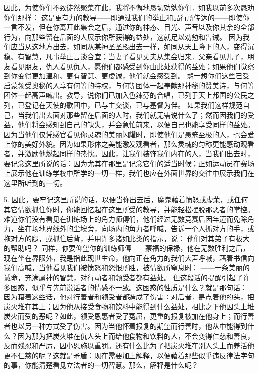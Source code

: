 因此，为使你们不致徒然聚集在此，我将不懈地恳切劝勉你们，如我以前多次恳劝你们那样： 这是更有力的教导——即通过我们的举止和品行所传达的——即使你一言不发，但在你离开此集会之后，通过你的神态、目光、声音以及你其余的全部行为，向那些留在后面的人展示你所获得的益处，这就足以劝勉和告诫。\newline{} 因为我们应当从这地方出去，如同从某神圣圣殿出去一样，如同从天上降下的人，变得沉稳、有智慧，凡事举止言谈合宜；当妻子看见丈夫从集会归来，父亲看见儿子，朋友看见朋友，仇人看见仇人，愿他们都感受到你由此处获得的益处；如果他们觉察到你变得更加温和、更有智慧、更虔诚，他们就会感受到。\newline{} 想一想你们这些已受启蒙领受奥秘的人享有何等的特权，与何等团体一起奉献那神秘的赞美诗，与何等团体一起高声喊出。教导，说你们已加入色辣芬的合唱，已列于天上邦国的公民之列，已登记在天使的歌团中，已与主交谈，已与基督为伴。\newline{} 如果我们这样规范自己，当我们出去面对那些留在后面的人时，我们就无需说什么了；然而因我们的受益，他们将会感知到自己的缺失，并会急忙前来，以便自己也能享受同样的益处。因为当他们仅凭感官看见你灵魂的美丽闪耀时，即使他们是愚笨至极的人，也会爱上你的美好外貌。因为如果形体之美能激发观看者，那么灵魂的匀称更能感动观看者，并激励他燃起同样的热忱。因此，让我们装饰我们内在的人，当我们出去时，要记念这里所说的话：因为尤其在那里是记念它们的适当时候；正如运动员在赛场上展示他在训练学校中所学的一切一样，我们也应在外面世界的交往中展示我们在这里所听到的一切。\par

5. 因此，要牢记这里所说的话，以便当你出去后，魔鬼藉着愤怒或虚荣，或任何其它情欲抓住你时，你能回忆起在这里所受的教导，并能轻松摆脱那恶者的掌控。\newline{} 难道你们没有看见在训练场上的角力师傅们，他们经过无数竞赛后因年迈而免除角力，坐在场地界线外的尘埃旁，向场内的角力者呼喊，告诉一个人抓对方的手，或拖对方的腿，或抓住后背，并用许多诸如此类的指示，说： 他们对其弟子有极大的帮助吗？\newline{} 同样，你要仰望你的训练师傅——蒙福的保禄，他在无数胜利之后，现在坐在界限外，我是指此现世生命，他向正在角力的我们大声呼喊，藉着书信向我们高喊，当他看见我们被愤怒和怨恨所胜，被情欲所窒息时： ——一条美丽的诫命，充满属神的智慧，对行动者和领受者都有益处。\newline{} 但这段话的提醒引起了许多困惑，似乎与先前说话者的情感不一致。这困惑的性质是什么？就是那句话： 因为藉着这些话，他对行善者和领受者都造成了伤害：对后者，是点着他的头，把炭火堆在其上；因为他从接受食物和饮料中能得到什么益处，相比之下他因头上堆炭火而受的恶呢？如此，领受恩惠者受了冤屈，更重的报复被加在他身上；而行善者也以另一种方式受了伤害。因为当他怀着报复的期望而行善时，他从中能得到什么？因为那为把炭火堆在仇人头上而给他食物和饮料的人，不会变得仁慈和善良，反而残忍和严厉，因小恩施以重罚。还有什么比为了把炭火堆在别人头上而养活他更不仁慈的呢？这就是矛盾：现在需要加上解释，以便藉着那些似乎违反律法字句的事，你能清楚看见立法者的一切智慧。那么，解释是什么呢？\par


